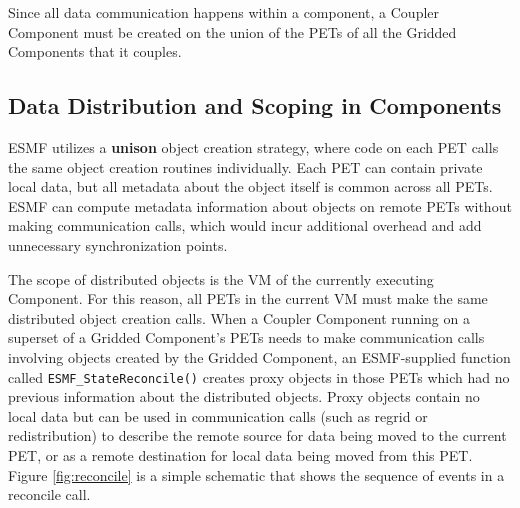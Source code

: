 Since all data communication happens within a component, a Coupler
Component must be created on the union of the PETs of all
the Gridded Components that it couples.  

\subsection{Data Distribution and Scoping in Components}
\label{sec:scoping}

ESMF utilizes a {\bf unison} object creation strategy, where code on
each PET calls the same object creation routines individually.
Each PET can contain private local data, but all metadata about
the object itself is common across all PETs.  
ESMF can compute metadata information about objects on 
remote PETs without making communication calls, which would 
incur additional overhead and add unnecessary synchronization points.

The scope of distributed objects is the VM of the currently 
executing Component.  For this reason, all
PETs in the current VM must make the same distributed object
creation calls.   When a Coupler Component running on a superset
of a Gridded Component's PETs needs to make communication calls
involving objects created by the Gridded Component,
an ESMF-supplied function called {\tt ESMF\_StateReconcile()} creates proxy
objects in those PETs which had no previous information about the
distributed objects.  Proxy objects contain no local data but
can be used in communication calls (such as regrid or redistribution)
to describe the remote source for data being moved to the current PET,
or as a remote destination for local data being moved from this PET.
Figure \ref{fig:reconcile} is a simple schematic that shows the 
sequence of events in a reconcile call.


